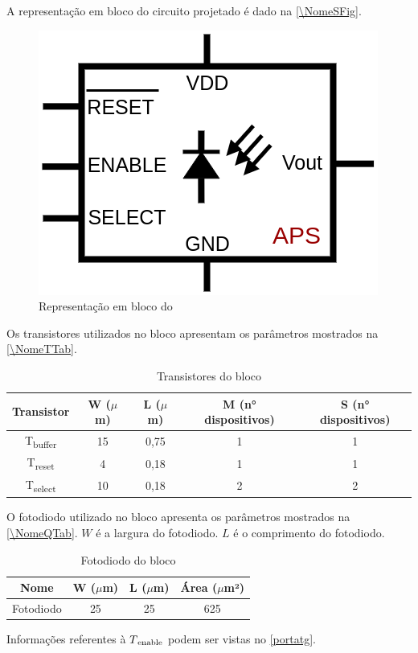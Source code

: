 A representação em bloco do circuito projetado é dado na \autoref{\NomeSFig}.

\begin{figure}[!h]
 \centering
    \centering
    \caption{\label{\NomeSFig}Representação em bloco do \NomeBloco} 
    \includegraphics[scale=0.3]{Circuitos/APS_block.png}
\end{figure}

Os transistores utilizados no bloco apresentam os par\^ametros mostrados na \autoref{\NomeTTab}.

\begin{table}[!h]
\caption{Transistores do bloco \NomeBloco}
\label{\NomeTTab}
\centering
\begin{tabular}{ccccc}
\toprule
Transistor & W ($\mu$m)  & L ($\mu$m)           & M (n° dispositivos) & S (n° dispositivos)\\
\midrule \midrule
T\textsubscript{buffer} & 15 & 0,75 & 1 & 1\\
\midrule
T\textsubscript{reset} & 4 & 0,18 & 1 & 1\\
\midrule
T\textsubscript{select} & 10 & 0,18 & 2 & 2\\
\bottomrule
\end{tabular}
\end{table}

O fotodiodo utilizado no bloco apresenta os par\^ametros mostrados na \autoref{\NomeQTab}. $W$ é a largura do fotodiodo. $L$ é o comprimento do fotodiodo.

\begin{table}[!h]
\caption{Fotodiodo do bloco \NomeBloco}
\label{\NomeQTab}
\centering
\begin{tabular}{cccc}
\toprule
Nome & W ($\mu$m)  & L ($\mu$m) & Área ($\mu$m²)\\
\midrule \midrule
Fotodiodo & 25 & 25 & 625\\
\bottomrule
\end{tabular}
\end{table}

Informações referentes à $T\textsubscript{enable}$ podem ser vistas no \autoref{portatg}.